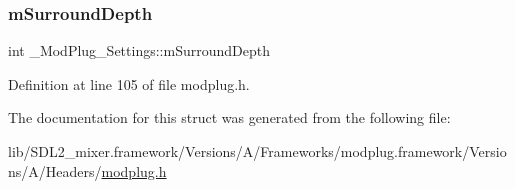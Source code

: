 \subsubsection{\texorpdfstring{mSurroundDepth}{mSurroundDepth}}
{\footnotesize\ttfamily int \+\_\+\+Mod\+Plug\+\_\+\+Settings\+::m\+Surround\+Depth}



Definition at line 105 of file modplug.\+h.



The documentation for this struct was generated from the following file\+:\begin{DoxyCompactItemize}
\item 
lib/\+S\+D\+L2\+\_\+mixer.\+framework/\+Versions/\+A/\+Frameworks/modplug.\+framework/\+Versions/\+A/\+Headers/\mbox{\hyperlink{modplug_8h}{modplug.\+h}}\end{DoxyCompactItemize}
